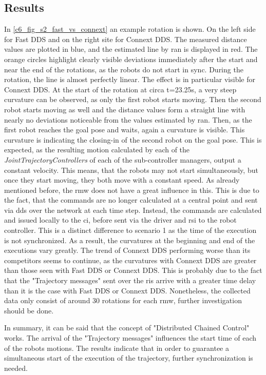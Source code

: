 \subsection{Results}
In \autoref{c6_fig_s2_fast_vs_connext} an example rotation is shown. On the left side for Fast DDS and on the right site for Connext DDS. The measured distance values are plotted in blue, and the estimated line by \gls{ran} is displayed in red. The orange circles highlight clearly visible deviations immediately after the start and near the end of the rotations, as the robots do not start in sync. During the rotation, the line is almost perfectly linear. The effect is in particular visible for Connext DDS. At the start of the rotation at circa t=23.25s, a very steep curvature can be observed, as only the first robot starts moving. Then the second robot starts moving as well and the distance values form a straight line with nearly no deviations noticeable from the values estimated by \gls{ran}. Then, as the first robot reaches the goal pose and waits, again a curvature is visible. This curvature is indicating the closing-in of the second robot on the goal pose.\newline
This is expected, as the resulting motion calculated by each of the \textit{JointTrajectoryControllers} of each of the sub-controller managers, output a constant velocity. This means, that the robots may not start simultaneously, but once they start moving, they both move with a constant speed. As already mentioned before, the \gls{rmw} does not have a great influence in this. This is due to the fact, that the commands are no longer calculated at a central point and sent via \gls{dds} over the network at each time step. Instead, the commands are calculated and issued locally to the \gls{ci}, before sent via the driver and \gls{rsi} to the robot controller. This is a distinct difference to scenario 1 as the time of the execution is not synchronized. As a result, the curvatures at the beginning and end of the executions vary greatly. The trend of Connext DDS performing worse than its competitors seems to continue, as the curvatures with Connext DDS are greater than those seen with Fast DDS or Connext DDS. This is probably due to the fact that the "Trajectory messages" sent over the \glspl{ri} arrive with a greater time delay than it is the case with Fast DDS or Connext DDS. Nonetheless, the collected data only consist of around 30 rotations for each \gls{rmw}, further investigation should be done.

In summary, it can be said that the concept of "Distributed Chained Control" works. The arrival of the "Trajectory messages" influences the start time of each of the robots motions. The results indicate that in order to guarantee a simultaneous start of the execution of the trajectory, further synchronization is needed. 

